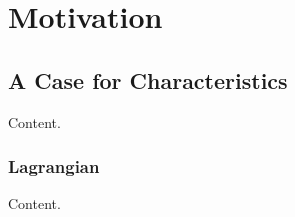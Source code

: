 \chapter{Motivation}

\section{A Case for Characteristics}

Content.

\subsection{Lagrangian}

Content.
